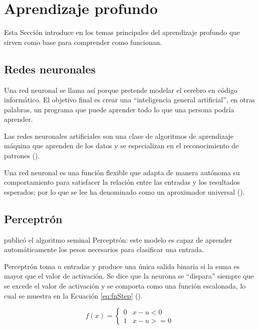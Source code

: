 \section{Aprendizaje profundo}

Esta Sección introduce en los temas principales del aprendizaje profundo que sirven como base para comprender como funcionan.

\subsection{Redes neuronales}

Una red neuronal se llama así porque pretende modelar el cerebro en código informático. El objetivo final es crear una “inteligencia general artificial”, en otras palabras, un programa que puede aprender todo lo que una persona podría aprender.

Las redes neuronales artificiales son una clase de algoritmos de aprendizaje máquina que aprenden de los datos y se especializan en el reconocimiento de patrones (\cite{rosebrock2017deep}).

Una red neuronal es una función flexible que adapta de manera autónoma su comportamiento para satisfacer la relación entre las entradas y los resultados esperados; por lo que se lee ha denominado como un aproximador universal (\cite{goyal2018Deep}).

\subsection{Perceptrón}

\citeauthor{rosenblatt1958Perceptron} publicó el algoritmo seminal Perceptrón: este modelo es capaz de aprender automáticamente los pesos necesarios para clasificar una entrada.

Perceptrón toma $n$ entradas y produce una única salida binaria si la suma es mayor que el valor de activación. Se dice que la neurona se “dispara” siempre que se excede el valor de activación y se comporta como una función escalonada, lo cual se muestra en la Ecuación \ref{eq:fnStep} (\cite{goyal2018Deep}).

\begin{equation}
\label{eq:fnStep}
    f\left(x\right)=\begin{cases}0 & x -u < 0\\1 & x -u >= 0\end{cases}
\end{equation}




